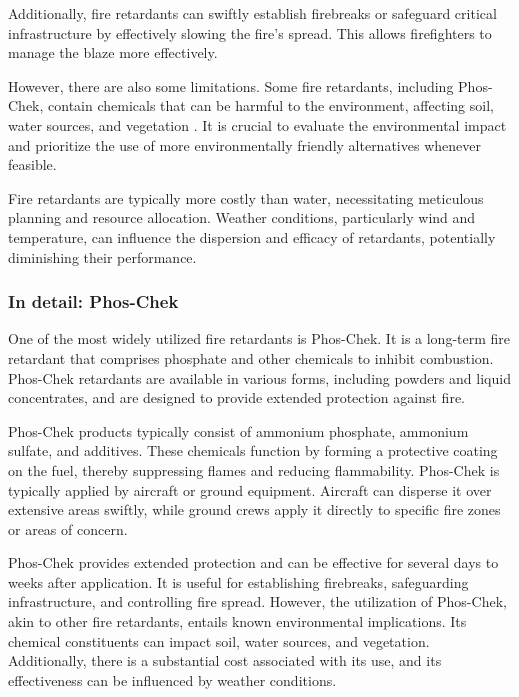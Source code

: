 \documentclass[
  12 pt,
]{Nemilov}
\begin{document}
Additionally, fire retardants can swiftly establish firebreaks or safeguard critical infrastructure by effectively slowing the fire's spread. This allows firefighters to manage the blaze more effectively.

However, there are also some limitations. Some fire retardants, including Phos-Chek, contain chemicals that can be harmful to the environment, affecting soil, water sources, and vegetation \citep{buscemi2002effects, dietrich2014toxicity, lanctot2024metabolomic, tunstill2022effects}. It is crucial to evaluate the environmental impact and prioritize the use of more environmentally friendly alternatives whenever feasible.

Fire retardants are typically more costly than water, necessitating meticulous planning and resource allocation. Weather conditions, particularly wind and temperature, can influence the dispersion and efficacy of retardants, potentially diminishing their performance.

\subsubsection{In detail: Phos-Chek}\label{in-detail-phos-chek}

One of the most widely utilized fire retardants is Phos-Chek. It is a long-term fire retardant that comprises phosphate and other chemicals to inhibit combustion. Phos-Chek retardants are available in various forms, including powders and liquid concentrates, and are designed to provide extended protection against fire.

Phos-Chek products typically consist of ammonium phosphate, ammonium sulfate, and additives. These chemicals function by forming a protective coating on the fuel, thereby suppressing flames and reducing flammability. Phos-Chek is typically applied by aircraft or ground equipment. Aircraft can disperse it over extensive areas swiftly, while ground crews apply it directly to specific fire zones or areas of concern.

Phos-Chek provides extended protection and can be effective for several days to weeks after application. It is useful for establishing firebreaks, safeguarding infrastructure, and controlling fire spread. However, the utilization of Phos-Chek, akin to other fire retardants, entails known environmental implications. Its chemical constituents can impact soil, water sources, and vegetation. Additionally, there is a substantial cost associated with its use, and its effectiveness can be influenced by weather conditions.
\end{document}
